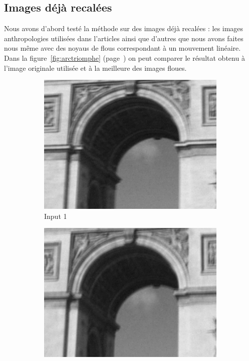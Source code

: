 \documentclass[a4paper,10pt]{report}
\begin{document}
\subsection{Images déjà recalées}
Nous avons d'abord testé la méthode sur des images déjà recalées : 
les images anthropologies utilisées dans l'articles ainsi que d'autres que nous avons faites 
nous même avec des noyaus de flous correspondant à un mouvement linéaire. Dans la figure~\ref{fig:arctriomphe}
(page~\pageref{fig:arctriomphe}) on peut comparer le résultat obtenu à
l'image originale utilisée et à la meilleure des images floues.

\begin{figure}[h]
 
\begin{subfigure}{0.24\textwidth}
\includegraphics[width=0.9\linewidth]{ressource/detail_flou1.png} 
\caption{Input 1}
\label{fig:Flou1}
\end{subfigure}
\begin{subfigure}{0.24\textwidth}
\includegraphics[width=0.9\linewidth]{ressource/detail_flou2.png}

\end{subfigure}
\end{figure}
\end{document}
